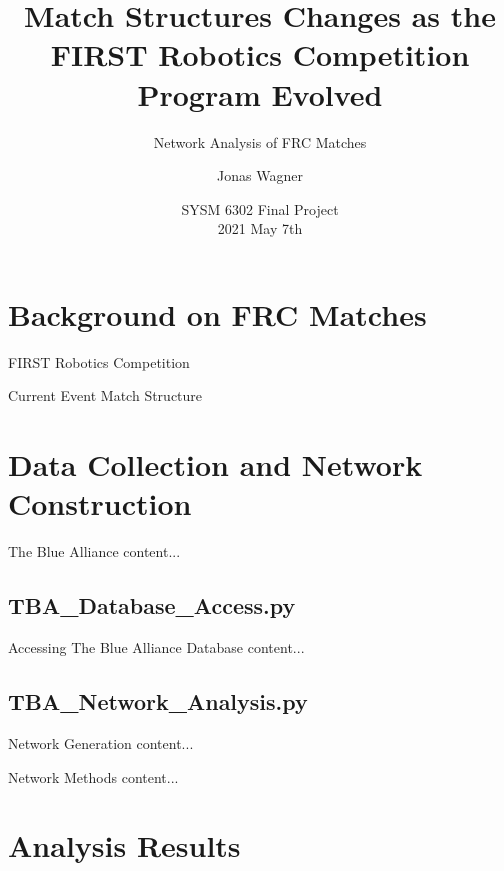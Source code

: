 \documentclass[10pt]{beamer}
\title[Network Analysis of FRC Matches]{Match Structures Changes as the FIRST Robotics Competition Program Evolved}
\subtitle{Network Analysis of FRC Matches}
\author{Jonas Wagner}
\institute[UTDallas]{Univeristy of Texas at Dallas}
\date[2021-05-07]{SYSM 6302 Final Project\\ 2021 May 7th}
\begin{document}
\begin{frame}
	\titlepage
\end{frame}

\section{Background on FRC Matches}
\begin{frame}{FIRST Robotics Competition}
	
\end{frame}

\begin{frame}{Current Event Match Structure}
	
\end{frame}

\section{Data Collection and Network Construction}
\begin{frame}{The Blue Alliance}
	content...
\end{frame}

\subsection{TBA\_Database\_Access.py}
\begin{frame}{Accessing The Blue Alliance Database}
	content...
\end{frame}

\subsection{TBA\_Network\_Analysis.py}
\begin{frame}{Network Generation}
	content...
\end{frame}

\begin{frame}{Network Methods}
	content...
\end{frame}

\section{Analysis Results}
\end{document}
